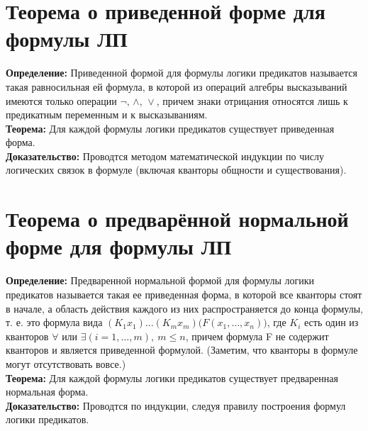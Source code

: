 \documentclass[../main.tex]{subfiles}
\begin{document}
\section{Теорема о приведенной форме для формулы ЛП}
\textbf{Определение:
} Приведенной формой для формулы логики предикатов называется такая равносильная ей формула, в которой из операций алгебры высказываний имеются только операции $\lnot,\,\land,\,\lor$, причем знаки отрицания относятся лишь к предикатным переменным и к высказываниям.\\
\textbf{Теорема:
} Для каждой формулы логики предикатов существует приведенная форма. \\
\textbf{Доказательство:
} Проводтся методом математической индукции по числу логических связок в формуле (включая кванторы общности и существования).

\section{Теорема о предварённой нормальной форме для формулы ЛП}
\textbf{Определение:
} Предваренной нормальной формой для формулы логики предикатов называется такая ее приведенная форма, в которой все кванторы стоят в начале, а область действия каждого из них распространяется до конца формулы, т. е. это формула вида $(K_1x_1)\ldots(K_mx_m)\bigl(F(x_1,\ldots,x_n)\bigr)$, где $K_i$ есть один из кванторов $\forall$ или $\exists (i=1,\ldots,m),~m \leqslant n$, причем формула F не содержит кванторов и является приведенной формулой. (Заметим, что кванторы в формуле могут отсутствовать вовсе.) \\
\textbf{Теорема:
} Для каждой формулы логики предикатов существует предваренная нормальная форма. \\
\textbf{Доказательство:
} Проводтся по индукции, следуя правилу построения формул логики предикатов. \\

\end{document}

